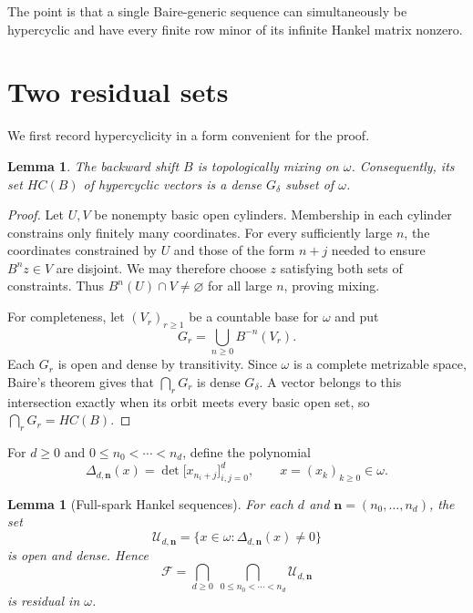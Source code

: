 \documentclass[11pt]{article}
\newtheorem{lemma}[theorem]{Lemma}
\begin{document}
The point is that a single Baire-generic sequence can simultaneously be
hypercyclic and have every finite row minor of its infinite Hankel matrix
nonzero.

\section{Two residual sets}

We first record hypercyclicity in a form convenient for the proof.

\begin{lemma}\label{lem:hc}
The backward shift $B$ is topologically mixing on $\omega$.  Consequently,
its set $HC(B)$ of hypercyclic vectors is a dense $G_\delta$ subset of
$\omega$.
\end{lemma}

\begin{proof}
Let $U,V$ be nonempty basic open cylinders.  Membership in each cylinder
constrains only finitely many coordinates.  For every sufficiently large
$n$, the coordinates constrained by $U$ and those of the form $n+j$ needed
to ensure $B^n z\in V$ are disjoint.  We may therefore choose $z$ satisfying
both sets of constraints.  Thus $B^n(U)\cap V\neq\varnothing$ for all large
$n$, proving mixing.

For completeness, let $(V_r)_{r\geq1}$ be a countable base for $\omega$ and
put
\[
  G_r=\bigcup_{n\geq0}B^{-n}(V_r).
\]
Each $G_r$ is open and dense by transitivity.  Since $\omega$ is a complete
metrizable space, Baire's theorem gives that $\bigcap_rG_r$ is dense
$G_\delta$.  A vector belongs to this intersection exactly when its orbit
meets every basic open set, so $\bigcap_rG_r=HC(B)$.
\end{proof}

For $d\geq0$ and $0\leq n_0<\cdots<n_d$, define the polynomial
\[
 \Delta_{d,\mathbf n}(x)
   =\det\bigl[x_{n_i+j}\bigr]_{i,j=0}^{d},
 \qquad x=(x_k)_{k\geq0}\in\omega.
\]

\begin{lemma}[Full-spark Hankel sequences]\label{lem:spark}
For each $d$ and $\mathbf n=(n_0,\ldots,n_d)$, the set
\[
  \mathcal U_{d,\mathbf n}
    =\{x\in\omega:\Delta_{d,\mathbf n}(x)\neq0\}
\]
is open and dense.  Hence
\[
  \mathcal F=\bigcap_{d\geq0}\ \bigcap_{0\leq n_0<\cdots<n_d}
  \mathcal U_{d,\mathbf n}
\]
is residual in $\omega$.
\end{lemma}
\end{document}
